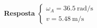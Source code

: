 \textbf{Resposta}
$
\begin{cases}
	\omega_{A}=\SI{36.5}{\radian/\second}\\
	v=\SI{5.48}{\meter/\second}
\end{cases}
$